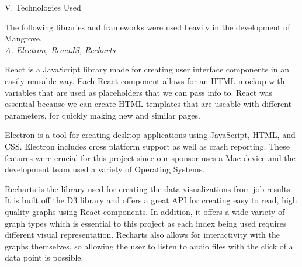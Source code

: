 \begin{center}
V. Technologies Used
\end{center}
\begin{flushleft}
  \setlength{\parindent}{0.125in}
The following libraries and frameworks were used heavily in the development of Mangrove.\\

\noindent\textit{A. Electron, ReactJS, Recharts}\par
React is a JavaScript library made for creating user interface components in an easily reusable way. Each React component allows for an HTML mockup with variables that are used as placeholders that we can pass info to. React was essential because we can create HTML templates that are useable with different parameters, for quickly making new and similar pages.\par
Electron is a tool for creating desktop applications using JavaScript, HTML, and CSS. Electron includes cross platform support as well as crash reporting. These features were crucial for this project since our sponsor uses a Mac device and the development team used a variety of Operating Systems.\par
Recharts is the library used for creating the data visualizations from job results. It is built off the D3 library and offers a great API for creating easy to read, high quality graphs using React components. In addition, it offers a wide variety of graph types which is essential to this project as each index being used requires different visual representation. Recharts also allows for interactivity with the graphs themselves, so allowing the user to listen to audio files with the click of a data point is possible.\par


\end{flushleft}
